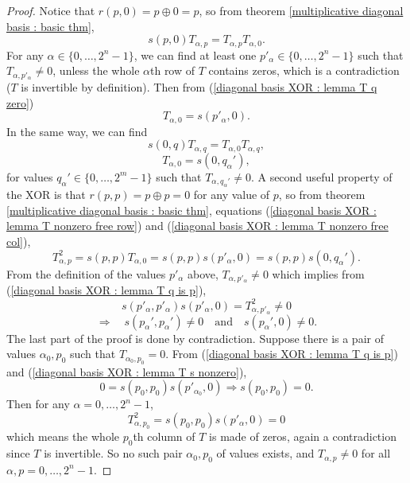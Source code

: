 \documentclass{article}
\begin{document}
\begin{proof}
    Notice that $r(p,0) = p \oplus 0 = p$, so from theorem \ref{multiplicative diagonal basis : basic thm},
    \begin{equation}
        \label{diagonal basis XOR : lemma T q zero}
        s(p,0) T_{\alpha, p} = T_{\alpha, p} T_{\alpha, 0}.
    \end{equation}
    For any $\alpha \in \{ 0,\ldots,2^n-1 \}$, we can find at least one $p'_\alpha \in \{ 0,\ldots, 2^n-1 \}$ such that $T_{\alpha, p'_\alpha} \neq 0$, unless the whole $\alpha$th row of $T$ contains zeros, which is a contradiction ($T$ is invertible by definition). Then from (\ref{diagonal basis XOR : lemma T q zero})
    \begin{equation}
        \label{diagonal basis XOR : lemma T nonzero free row}
        T_{\alpha, 0} = s(p'_\alpha,0).
    \end{equation}
    In the same way, we can find
    \begin{equation}
        \label{diagonal basis XOR : lemma T p zero}
        s(0,q) T_{\alpha, q} = T_{\alpha, 0} T_{\alpha, q},
    \end{equation}
    \begin{equation}
        \label{diagonal basis XOR : lemma T nonzero free col}
        T_{\alpha, 0} = s(0,q_{\alpha}'),
    \end{equation}
    for values $q_{\alpha}' \in \{ 0,\ldots,2^m-1 \}$ such that $T_{\alpha,q_{\alpha}'} \neq 0$. A second useful property of the XOR is that $r(p,p) = p \oplus p = 0$ for any value of $p$, so from theorem \ref{multiplicative diagonal basis : basic thm}, equations (\ref{diagonal basis XOR : lemma T nonzero free row}) and (\ref{diagonal basis XOR : lemma T nonzero free col}),
    \begin{equation}
        \label{diagonal basis XOR : lemma T q is p}
        T_{\alpha,p}^2 = s(p,p) T_{\alpha,0} = s(p,p) s(p'_\alpha,0) = s(p,p) s(0,q_{\alpha}').
    \end{equation}
    From the definition of the values $p'_{\alpha}$ above, $T_{\alpha, p'_\alpha} \neq 0$ which implies from (\ref{diagonal basis XOR : lemma T q is p}),
    $$ s(p'_\alpha,p'_\alpha) s(p'_\alpha,0) = T^2_{\alpha, p'_\alpha} \neq 0 $$
    \begin{equation}
        \label{diagonal basis XOR : lemma T s nonzero}
        \Rightarrow \quad s(p_{\alpha}', p_{\alpha}') \neq 0 \quad \text{and} \quad s(p_{\alpha}',0) \neq 0.
    \end{equation}
    The last part of the proof is done by contradiction. Suppose there is a pair of values $\alpha_0, p_0$ such that $T_{\alpha_0, p_0} = 0$. From (\ref{diagonal basis XOR : lemma T q is p}) and (\ref{diagonal basis XOR : lemma T s nonzero}),
    $$ 0 = s(p_0,p_0) s(p'_{\alpha_0},0) \Rightarrow s(p_0,p_0) = 0. $$
    Then for any $\alpha = 0,\ldots,2^n-1$,
    $$ T_{\alpha,p_0}^2 = s(p_0,p_0) s(p'_\alpha,0) = 0 $$
    which means the whole $p_0$th column of $T$ is made of zeros, again a contradiction since $T$ is invertible. So no such pair $\alpha_0, p_0$ of values exists, and $T_{\alpha,p} \neq 0$ for all $\alpha,p = 0, \ldots, 2^n-1$.
\end{proof}
\end{document}
